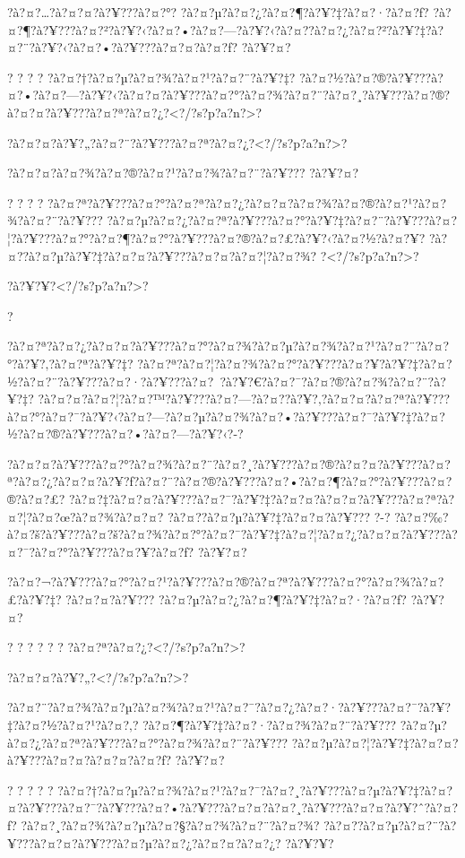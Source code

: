 \documentclass[11pt, openany]{book}
\begin{document}
{{{{{{{{{{?à?¤?\ldots{}?à?¤?¤?à?¥???à?¤?°? ?à?¤?µ?à?¤?¿?à?¤?¶?à?¥?‡?à?¤?·?à?¤?ƒ?
?à?¤?¶?à?¥???à?¤?²?à?¥?‹?à?¤?•?à?¤?---?à?¥?‹?à?¤?­?à?¤?¿?à?¤?²?à?¥?‡?à?¤?¨?à?¥?‹?à?¤?•?à?¥???à?¤?¤?à?¤?ƒ?
?à?¥?¤?

? ? ? ? ?à?¤?†?à?¤?µ?à?¤?¾?à?¤?¹?à?¤?¨?à?¥?‡?
?à?¤?½?à?¤?®?à?¥???à?¤?•?à?¤?---?à?¥?‹?à?¤?¤?à?¥???à?¤?°?à?¤?¾?à?¤?¨?à?¤?¸?à?¥???à?¤?®?à?¤?¤?à?¥???à?¤?ª?à?¤?¿?\textless{}?/?s?p?a?n?\textgreater{}?

?à?¤?¤?à?¥?„?à?¤?¨?à?¥???à?¤?ª?à?¤?¿?\textless{}?/?s?p?a?n?\textgreater{}?

?à?¤?¤?à?¤?¾?à?¤?®?à?¤?¹?à?¤?¾?à?¤?¨?à?¥??? ?à?¥?¤?

? ? ? ?
?à?¤?ª?à?¥???à?¤?°?à?¤?ª?à?¤?¿?à?¤?¤?à?¤?¾?à?¤?®?à?¤?¹?à?¤?¾?à?¤?¨?à?¥???
?à?¤?µ?à?¤?¿?à?¤?ª?à?¥???à?¤?°?à?¥?‡?à?¤?¨?à?¥???à?¤?¦?à?¥???à?¤?°?à?¤?¶?à?¤?°?à?¥???à?¤?®?à?¤?£?à?¥?‹?à?¤?½?à?¤?¥?
?à?¤?­?à?¤?µ?à?¥?‡?à?¤?¤?à?¥???à?¤?¤?à?¤?¦?à?¤?¾?
?\textless{}?/?s?p?a?n?\textgreater{}?

?à?¥?¥?\textless{}?/?s?p?a?n?\textgreater{}?

?

?à?¤?ª?à?¤?¿?à?¤?¤?à?¥???à?¤?°?à?¤?¾?à?¤?µ?à?¤?¾?à?¤?¹?à?¤?¨?à?¤?°?à?¥?‚?à?¤?ª?à?¥?‡?
?à?¤?ª?à?¤?¦?à?¤?¾?à?¤?°?à?¥???à?¤?¥?à?¥?‡?à?¤?½?à?¤?¨?à?¥???à?¤?·?à?¥???à?¤?~?à?¥?€?à?¤?¯?à?¤?®?à?¤?¾?à?¤?¨?à?¥?‡?
?à?¤?¤?à?¤?¦?à?¤?™?à?¥???à?¤?---?à?¤?­?à?¥?‚?à?¤?¤?à?¤?ª?à?¥???à?¤?°?à?¤?¯?à?¥?‹?à?¤?---?à?¤?µ?à?¤?¾?à?¤?•?à?¥???à?¤?¯?à?¥?‡?à?¤?½?à?¤?®?à?¥???à?¤?•?à?¤?---?à?¥?‹?-?

?à?¤?¤?à?¥???à?¤?°?à?¤?¾?à?¤?¨?à?¤?¸?à?¥???à?¤?®?à?¤?¤?à?¥???à?¤?ª?à?¤?¿?à?¤?¤?à?¥?ƒ?à?¤?¨?à?¤?®?à?¥???à?¤?•?à?¤?¶?à?¤?°?à?¥???à?¤?®?à?¤?£?
?à?¤?‡?à?¤?¤?à?¥???à?¤?¯?à?¥?‡?à?¤?¤?à?¤?¤?à?¥???à?¤?ª?à?¤?¦?à?¤?œ?à?¤?¾?à?¤?¤?
?à?¤?­?à?¤?µ?à?¥?‡?à?¤?¤?à?¥??? ?-?
?à?¤?‰?à?¤?š?à?¥???à?¤?š?à?¤?¾?à?¤?°?à?¤?¯?à?¥?‡?à?¤?¦?à?¤?¿?à?¤?¤?à?¥???à?¤?¯?à?¤?°?à?¥???à?¤?¥?à?¤?ƒ?
?à?¥?¤?

?à?¤?¬?à?¥???à?¤?°?à?¤?¹?à?¥???à?¤?®?à?¤?ª?à?¥???à?¤?°?à?¤?¾?à?¤?£?à?¥?‡?
?à?¤?¤?à?¥??? ?à?¤?µ?à?¤?¿?à?¤?¶?à?¥?‡?à?¤?·?à?¤?ƒ? ?à?¥?¤?

? ? ? ? ? ? ?à?¤?ª?à?¤?¿?\textless{}?/?s?p?a?n?\textgreater{}?

?à?¤?¤?à?¥?„?\textless{}?/?s?p?a?n?\textgreater{}?

?à?¤?¨?à?¤?¾?à?¤?µ?à?¤?¾?à?¤?¹?à?¤?¯?à?¤?¿?à?¤?·?à?¥???à?¤?¯?à?¥?‡?à?¤?½?à?¤?¹?à?¤?‚?
?à?¤?¶?à?¥?‡?à?¤?·?à?¤?¾?à?¤?¨?à?¥???
?à?¤?µ?à?¤?¿?à?¤?ª?à?¥???à?¤?°?à?¤?¾?à?¤?¨?à?¥???
?à?¤?µ?à?¤?¦?à?¥?‡?à?¤?¤?à?¥???à?¤?¤?à?¤?¤?à?¤?ƒ? ?à?¥?¤?

? ? ? ? ?
?à?¤?†?à?¤?µ?à?¤?¾?à?¤?¹?à?¤?¯?à?¤?¸?à?¥???à?¤?µ?à?¥?‡?à?¤?¤?à?¥???à?¤?¯?à?¥???à?¤?•?à?¥???à?¤?¤?à?¤?¸?à?¥???à?¤?¤?à?¥?ˆ?à?¤?ƒ?
?à?¤?¸?à?¤?¾?à?¤?µ?à?¤?§?à?¤?¾?à?¤?¨?à?¤?¾?
?à?¤?­?à?¤?µ?à?¤?¨?à?¥???à?¤?¤?à?¥???à?¤?µ?à?¤?¿?à?¤?¤?à?¤?¿? ?à?¥?¥?

}}}}}}}}}}
\end{document}
